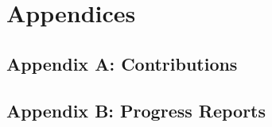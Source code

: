 \newcommand{\homedir}{/home/bscholtz/workspace/workspace-latex/templates/latex-template-uct/}



\newcommand{\coursecode}{EEE4XXXX}
\newcommand{\assignment}{Assignment One}
\newcommand{\lecturer}{Prof. Ed Boje}

\pagestyle{fancy}
\fancyhf{}
\cfoot{\thepage}






\newpage
\tableofcontents



\newpage








\newpage
\section*{Appendices}
\subsection*{Appendix A: Contributions}
\subsection*{Appendix B: Progress Reports}



